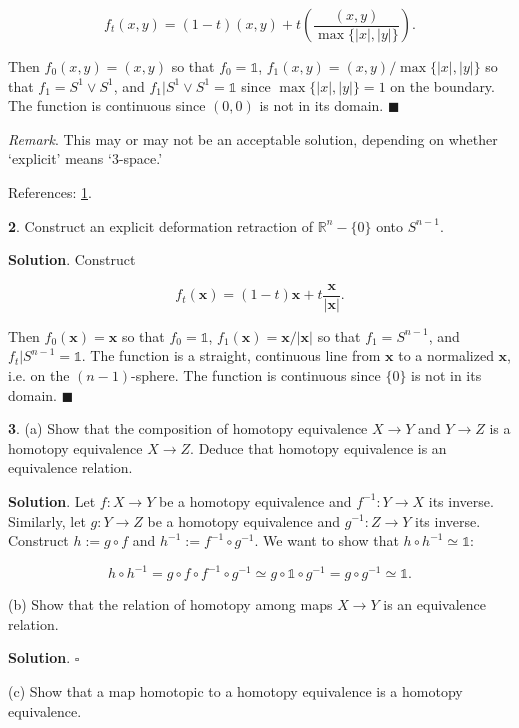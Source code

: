 \documentclass{article}
\newcommand{\R}{\mathbb{R}}
\newcommand{\identity}{\mathds{1}}
\begin{document}
$$f_{t}(x, y) = (1-t)(x, y) + t\left(\frac{(x, y)}{\max\{|x|, |y|\}}\right).$$

Then $f_{0}(x, y) = (x, y)$ so that $f_{0} = \identity$, $f_{1}(x, y) = (x, y) / \max\{|x|, |y|\}$ so that $f_{1} = S^{1}\vee S^{1}$, and $f_{1}|S^{1}\vee S^{1} = \identity$ since $\max \{|x|, |y|\} = 1$ on the boundary. The function is continuous since $(0, 0)$ is not in its domain. $\blacksquare$
\medskip

\textit{Remark}. This may or may not be an acceptable solution, depending on whether `explicit' means `3-space.'
\medskip

References: \href{https://riemannianhunger.wordpress.com/solutions-to-algebraic-topology-by-allen-hatcher/hatcher-0-1/}{1}.
\bigskip
\bigskip

\textbf{2}. Construct an explicit deformation retraction of $\R^{n} - \{0\}$ onto $S^{n-1}$.
\medskip

\textbf{Solution}. Construct

$$f_{t}(\mathbf{x}) = (1-t)\mathbf{x} + t\frac{\mathbf{x}}{|\mathbf{x}|}.$$

Then $f_{0}(\mathbf{x}) = \mathbf{x}$ so that $f_{0} = \identity$, $f_{1}(\mathbf{x}) = \mathbf{x}/|\mathbf{x}|$ so that $f_{1} = S^{n-1}$, and $f_{t}|S^{n-1} = \identity$. The function is a straight, continuous line from $\mathbf{x}$ to a normalized $\mathbf{x}$, i.e. on the $(n-1)$-sphere. The function is continuous since $\{0\}$ is not in its domain. $\blacksquare$
\bigskip
\bigskip

\textbf{3}. (a) Show that the composition of homotopy equivalence $X\to Y$ and $Y\to Z$ is a homotopy equivalence $X\to Z$. Deduce that homotopy equivalence is an equivalence relation.
\medskip

\textbf{Solution}. Let $f:X\to Y$ be a homotopy equivalence and $f^{-1}:Y\to X$ its inverse. Similarly, let $g:Y\to Z$ be a homotopy equivalence and $g^{-1}:Z\to Y$ its inverse. Construct $h := g\circ f$ and $h^{-1} := f^{-1}\circ g^{-1}$. We want to show that $h\circ h^{-1}\simeq \identity$:

$$h\circ h^{-1} = g\circ f\circ f^{-1}\circ g^{-1}\simeq g\circ \identity\circ g^{-1} = g\circ g^{-1}\simeq \identity.$$

(b) Show that the relation of homotopy among maps $X\to Y$ is an equivalence relation.
\medskip

\textbf{Solution}. $\square$
\medskip

(c) Show that a map homotopic to a homotopy equivalence is a homotopy equivalence.
\medskip
\end{document}
